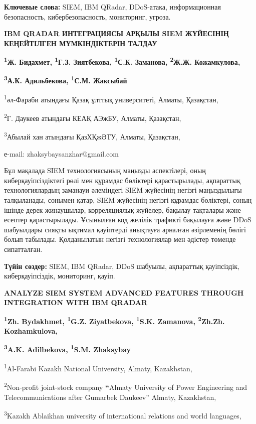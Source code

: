 \textbf{Ключевые слова:} SIEM, IBM QRadar, DDoS-атака, информационная
безопасность, кибербезопасность, мониторинг, угроза.

\textbf{IBM QRADAR ИНТЕГРАЦИЯСЫ АРҚЫЛЫ SIEM ЖҮЙЕСІНІҢ КЕҢЕЙТІЛГЕН
МҮМКІНДІКТЕРІН ТАЛДАУ}

\textbf{\textsuperscript{1}Ж. Бидахмет, \textsuperscript{1}Г.З.
Зиятбекова, \textsuperscript{1}С.К. Заманова, \textsuperscript{2}Ж.Ж.
Кожамкулова,}

\textbf{\textsuperscript{3}А.К. Адильбекова, \textsuperscript{1}С.М.
Жаксыбай}

\textsuperscript{1}әл-Фараби атындағы Қазақ ұлттық университеті, Алматы,
Қазақстан,

\textsuperscript{2}Г. Даукеев атындағы КЕАҚ АЭжБУ, Алматы, Қазақстан,

\textsuperscript{3}Абылай хан атындағы ҚазХҚжӘТУ, Алматы, Қазақстан,

е-mail: zhaksybaysanzhar@gmail.com

Бұл мақалада SIEM технологиясының маңызды аспектілері, оның
киберқауіпсіздіктегі рөлі мен құрамдас бөліктері қарастырылады,
ақпараттық технологиялардың заманауи әлеміндегі SIEM жүйесінің негізгі
маңыздылығы талқыланады, сонымен қатар, SIEM жүйесінің негізгі құрамдас
бөліктері, соның ішінде дерек жинаушылар, корреляциялық жүйелер, бақылау
тақталары және есептер қарастырылады. Ұсынылған код желілік трафикті
бақылауға және DDoS шабуылдары сияқты ықтимал қауіптерді анықтауға
арналған әзірлеменің бөлігі болып табылады. Қолданылатын негізгі
технологиялар мен әдістер төменде сипатталған.

\textbf{Түйін сөздер:} SIEM, IBM QRadar, DDoS шабуылы, ақпараттық
қауіпсіздік, киберқауіпсіздік, мониторинг, қауіп.

\textbf{ANALYZE SIEM SYSTEM ADVANCED FEATURES THROUGH INTEGRATION WITH
IBM QRADAR}

\textbf{\textsuperscript{1}Zh. Bydakhmet, \textsuperscript{1}G.Z.
Ziyatbekova, \textsuperscript{1}S.K. Zamanova, \textsuperscript{2}Zh.Zh.
Kozhamkulova,}

\textbf{\textsuperscript{3}A.K. Adilbekova, \textsuperscript{1}S.M.
Zhaksybay}

\textsuperscript{1}Al-Farabi Kazakh National University, Almaty,
Kazakhstan,

\textsuperscript{2}Non-profit joint-stock company \textbf{``}Almaty
University of Power Engineering and Telecommunications after Gumarbek
Daukeev'' Almaty, Kazakhstan,

\textsuperscript{3}Kazakh Ablaikhan university of international
relations and world languages,

